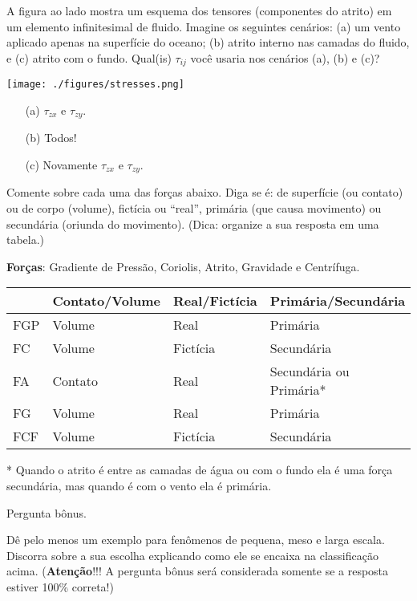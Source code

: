 \documentclass[letterpaper,portuguese,12pt,pdftex]{exam}
\begin{document}
\begin{questions}
  \begin{minipage}[b]{0.85\linewidth}
    \question[2\half]
    A figura ao lado mostra um esquema dos tensores (componentes do atrito) em
    um elemento infinitesimal de fluido.  Imagine os seguintes cenários: (a) um
    vento aplicado apenas na superfície do oceano; (b) atrito interno nas
    camadas do fluido, e (c) atrito com o fundo.  Qual(is) $\tau_{ij}$ você
    usaria nos cenários (a), (b) e (c)?
  \end{minipage}
  \hfill
  \begin{minipage}[b]{0.35\linewidth}
    \texttt{[image: ./figures/stresses.png]}
  \end{minipage}

  \begin{solution}
    \begin{itemize}
      \item[(a)] $\tau_{zx}$ e $\tau_{zy}$.
      \item[(b)] Todos!
      \item[(c)] Novamente $\tau_{zx}$ e $\tau_{zy}$.
    \end{itemize}

  \end{solution}


  \question[5]
  Comente sobre cada uma das forças abaixo.  Diga se é: de superfície
  (ou contato) ou de corpo (volume), fictícia ou ``real'', primária (que causa
  movimento) ou secundária (oriunda do movimento). (Dica: organize a sua resposta
  em uma tabela.)

  {\bf Forças}: Gradiente de Pressão, Coriolis, Atrito, Gravidade e Centrífuga.
  \begin{solution}
    \begin{tabular}{l|l|l|l}
        & Contato/Volume & Real/Fictícia & Primária/Secundária \\
    \hline
    FGP & Volume         & Real          & Primária \\
    FC  & Volume         & Fictícia      & Secundária \\
    FA  & Contato        & Real          & Secundária ou Primária* \\
    FG  & Volume         & Real          & Primária \\
    FCF & Volume         & Fictícia      & Secundária \\
    \hline
    \end{tabular}

    * Quando o atrito é entre as camadas de água ou com o fundo ela é uma força
    secundária, mas quando é com o vento ela é primária.
  \end{solution}

  \bonusquestion[5]
  Pergunta bônus.

  Dê pelo menos um exemplo para fenômenos de pequena, meso e larga escala.
  Discorra sobre a sua escolha explicando como ele se encaixa na classificação
  acima. ({\bf Atenção}!!! A pergunta bônus será considerada somente se a
  resposta estiver 100\% correta!)

\end{questions}
\end{document}
